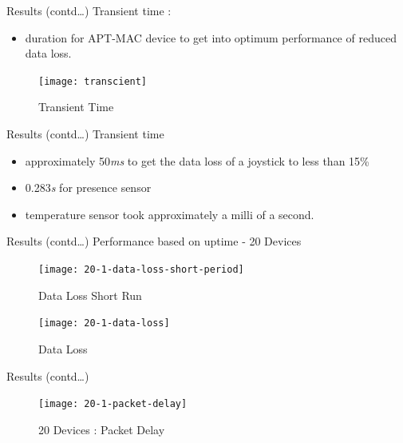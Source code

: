 \documentclass [xcolor=svgnames, t] {beamer}
\begin{document}
\begin{frame}{Results (contd\ldots)}
    Transient time :
    \begin{itemize}
        \item[] duration for APT-MAC device to get into optimum performance of reduced data loss.
    \end{itemize}
    \begin{figure}
        \texttt{[image: transcient]}
        \caption{Transient Time}
    \end{figure}
\end{frame}


\begin{frame}{Results (contd\ldots)}
    Transient time\\
    \vspace{.5cm}
    \begin{itemize}
        \item approximately 50\textit{ms} to get the data loss of a joystick to less than 15\%
        \item 0.283\textit{s} for presence sensor
        \item temperature sensor took approximately a milli of a second.
    \end{itemize}
\end{frame}

\begin{frame}{Results (contd\ldots)}
    Performance based on uptime - 20 Devices
    \vspace{.5cm}
    \begin{figure}[ht]
        \begin{minipage}[b]{0.48\linewidth}
             \centering
                 \texttt{[image: 20-1-data-loss-short-period]}
                  \caption{Data Loss Short Run}
                   \label{fig:20-device-short-run}
                 \end{minipage}
                 \hspace{.2cm}
                 \begin{minipage}[b]{0.48\linewidth}
                     \centering
                     \texttt{[image: 20-1-data-loss]}
                     \caption{Data Loss}  
                     \label{fig:fig:20-device-DL}
                 \end{minipage}
             \end{figure}
\end{frame}

\begin{frame}{Results (contd\ldots)}
    \begin{figure}[ht]
        \centering
        \texttt{[image: 20-1-packet-delay]}
        \caption{20 Devices : Packet Delay}
        \label{fig:20-devices-PD}
    \end{figure}

\end{frame}
\end{document}
